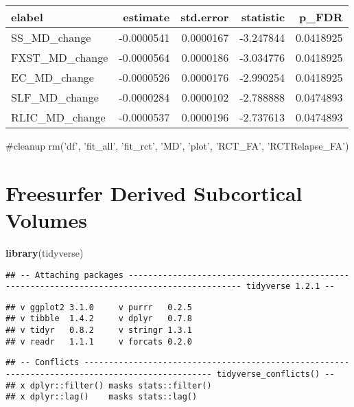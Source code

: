 \documentclass[]{article}
\newenvironment{Shaded}{\begin{snugshade}}{\end{snugshade}}
\newcommand{\KeywordTok}[1]{\textcolor[rgb]{0.13,0.29,0.53}{\textbf{#1}}}
\newcommand{\NormalTok}[1]{#1}
\theoremstyle{definition}
\theoremstyle{definition}
\theoremstyle{definition}
\theoremstyle{remark}
\begin{document}
\begin{tabular}{l|r|r|r|r}
\hline
elabel & estimate & std.error & statistic & p\_FDR\\
\hline
SS\_MD\_change & -0.0000541 & 0.0000167 & -3.247844 & 0.0418925\\
\hline
FXST\_MD\_change & -0.0000564 & 0.0000186 & -3.034776 & 0.0418925\\
\hline
EC\_MD\_change & -0.0000526 & 0.0000176 & -2.990254 & 0.0418925\\
\hline
SLF\_MD\_change & -0.0000284 & 0.0000102 & -2.788888 & 0.0474893\\
\hline
RLIC\_MD\_change & -0.0000537 & 0.0000196 & -2.737613 & 0.0474893\\
\hline
\end{tabular}

\begin{Shaded}
\begin{Highlighting}[]
\NormalTok{#cleanup}
\NormalTok{rm('df', 'fit_all', 'fit_rct', 'MD', 'plot', 'RCT_FA', 'RCTRelapse_FA')}
\end{Highlighting}
\end{Shaded}

\section{Freesurfer Derived Subcortical
Volumes}\label{freesurfer-derived-subcortical-volumes}

\begin{Shaded}
\begin{Highlighting}[]
\KeywordTok{library}\NormalTok{(tidyverse)}
\end{Highlighting}
\end{Shaded}

\begin{verbatim}
## -- Attaching packages --------------------------------------------------------------------------------------------- tidyverse 1.2.1 --
\end{verbatim}

\begin{verbatim}
## v ggplot2 3.1.0     v purrr   0.2.5
## v tibble  1.4.2     v dplyr   0.7.8
## v tidyr   0.8.2     v stringr 1.3.1
## v readr   1.1.1     v forcats 0.2.0
\end{verbatim}

\begin{verbatim}
## -- Conflicts ------------------------------------------------------------------------------------------------ tidyverse_conflicts() --
## x dplyr::filter() masks stats::filter()
## x dplyr::lag()    masks stats::lag()
\end{verbatim}
\end{document}
